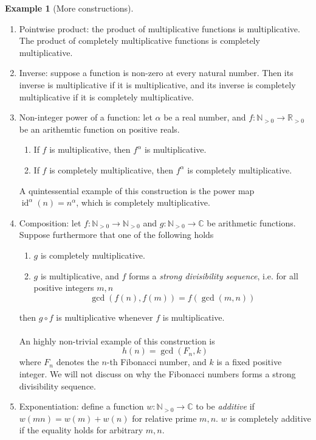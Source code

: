 \documentclass{article}
\theoremstyle{definition}
\newtheorem{example}[theorem]{Example}
\begin{document}
\begin{example}[More constructions] \ 
\begin{enumerate}
	\item Pointwise product: the product of multiplicative functions is multiplicative. The product of completely multiplicative functions is completely multiplicative.
	\item Inverse: suppose a function is non-zero at every natural number. Then its inverse is multiplicative if it is multiplicative, and its inverse is completely multiplicative if it is completely multiplicative.
	\item Non-integer power of a function: let $\alpha$ be a real number, and $f: \mathbb{N}_{> 0} \to \mathbb{R}_{> 0}$ be an arithemtic function on positive reals.
	\begin{enumerate}
		\item If $f$ is multiplicative, then $f^\alpha$ is multiplicative.
		\item If $f$ is completely multiplicative, then $f^\alpha$ is completely multiplicative.
	\end{enumerate}
	A quintessential example of this construction is the power map $\operatorname{id}^\alpha (n) = n^\alpha$, which is completely multiplicative.
	\item Composition: let $f: \mathbb{N}_{> 0} \to \mathbb{N}_{> 0}$ and $g: \mathbb{N}_{> 0} \to \mathbb{C}$ be arithmetic functions. Suppose furthermore that one of the following holds
	\begin{enumerate}
		\item $g$ is completely multiplicative.
		\item $g$ is multiplicative, and $f$ forms a \emph{strong divisibility sequence}, i.e. for all positive integers $m, n$
		$$\gcd(f(n), f(m)) = f(\gcd(m, n))$$
	\end{enumerate}
	then $g \circ f$ is multiplicative whenever $f$ is multiplicative.
	\\
	\\
	An highly non-trivial example of this construction is
	$$h(n) = \gcd(F_n, k)$$ where $F_n$ denotes the $n$-th Fibonacci number, and $k$ is a fixed positive integer. We will not discuss on why the Fibonacci numbers forms a strong divisibility sequence.
	\item Exponentiation: define a function $w: \mathbb{N}_{> 0} \to \mathbb{C}$ to be \emph{additive} if $w(mn) = w(m) + w(n)$ for relative prime $m, n$. $w$ is completely additive if the equality holds for arbitrary $m, n$.
	\\

\end{enumerate}
\end{example}
\end{document}
